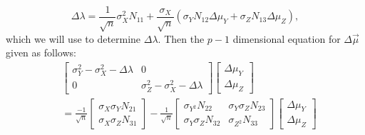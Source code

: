 \documentclass[12pt]{amsart}
\theoremstyle{definition}
\numberwithin{equation}{section}
\numberwithin{equation}{section}
\theoremstyle{remark}
\numberwithin{equation}{section}
\begin{document}
\begin{equation}
\label{Deltalambda}
\Delta\lambda=\frac{1}{\sqrt{n}}\sigma^{2}_{X} N_{11}
+\frac{\sigma_X}{\sqrt{n}}(\sigma_Y N_{12}\Delta\mu_Y+
\sigma_Z N_{13}\Delta\mu_Z),
\end{equation}
which we will use to determine $\Delta\lambda$. Then the $p-1$ dimensional equation for $\Delta\vec{\mu}$ given as follows:
\begin{align*}&\left[
\begin{array}{ccccccccc}
\sigma_Y^2-\sigma_X^2-\Delta\lambda&0\\
0&\sigma_Z^2-\sigma_X^2-\Delta\lambda
\end{array}
\right]
\left[\begin{array}{c}
\Delta\mu_Y\\
\Delta\mu_Z
\end{array}\right]\\
&=
\frac{-1}{\sqrt{n}}
\left[
\begin{array}{c}
\sigma_X\sigma_Y N_{21}\\
\sigma_X\sigma_Z N_{31}
\end{array}
\right]-
\frac{1}{\sqrt{n}}\left[
\begin{array}{cc}
\sigma_{Y^2}N_{22}&\sigma_Y\sigma_Z N_{23}\\
\sigma_Y\sigma_Z N_{32}&\sigma_{Z^2} N_{33}
\end{array}\right]
\left[
\begin{array}{c}
\Delta\mu_Y\\
\Delta\mu_Z
\end{array}
\right]
\end{align*}
\end{document}
